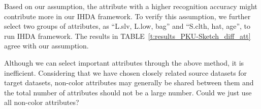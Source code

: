 \documentclass[journal]{IEEEtran}
\begin{document}
\tabcolsep=4pt
\begin{table}[!ht]
\centering
\caption{ Attribute recognition accuracy on source dataset (trained on target photo training set). ``L.slv'', ``L.low'', ``S.clth'' denote ``length of sleeve'', ``length of lower-body clothing'', ``style of clothing'', resp.}
\label{t:PKU-Sketch_att_selection}
\end{table}

Based on our assumption, the attribute with a higher recognition accuracy might contribute more in our IHDA framework. To verify this assumption, we further select two groups of attributes, as ``L.slv, L.low, bag'' and ``S.clth, hat, age'', to run IHDA framework. The results in TABLE~\ref{t:results_PKU-Sketch_diff_att} agree with our assumption.



  \tabcolsep=8pt
  \begin{table}[!ht]
  \centering
  \caption{The sketch-to-photo retrieval performance by using different attributes on PKU-Sketch dataset.}
  \label{t:results_PKU-Sketch_diff_att}
  \end{table}
 

Although we can select important attributes through the above method, it is inefficient. Considering that we have chosen closely related source datasets for target datasets, non-color attributes may generally be shared between them and the total number of attributes should not be a large number. Could we just use all non-color attributes? 
\end{document}
